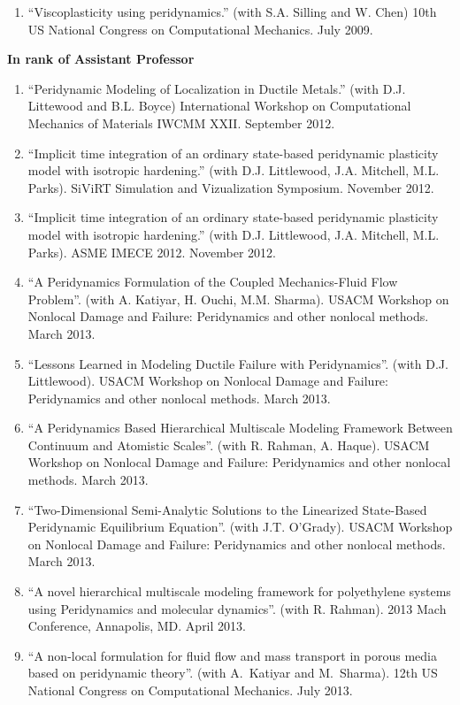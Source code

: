 \ifdefined\iscockrell
\begin{enumerate}
    \item ``Viscoplasticity using peridynamics.''  (with S.A. Silling and W. Chen) 10th US National Congress on Computational Mechanics. July 2009.
\end{enumerate}
    \pagebreak[2]
    \textbf{In rank of Assistant Professor}
\begin{enumerate}[resume]
    \item ``Peridynamic Modeling of Localization in Ductile Metals.'' (with D.J. Littewood and B.L. Boyce)  International Workshop on Computational Mechanics of Materials IWCMM XXII. September 2012.
    \item ``Implicit time integration of an ordinary state-based peridynamic plasticity model with isotropic hardening.'' (with D.J. Littlewood, J.A. Mitchell, M.L. Parks).  SiViRT Simulation and Vizualization Symposium.  November 2012.
    \item ``Implicit time integration of an ordinary state-based peridynamic plasticity model with isotropic hardening.'' (with D.J. Littlewood, J.A. Mitchell, M.L. Parks).  ASME IMECE 2012.  November 2012.
    \item ``A Peridynamics Formulation of the Coupled Mechanics-Fluid Flow Problem''. (with A. Katiyar, H. Ouchi, M.M. Sharma). USACM Workshop on Nonlocal Damage and Failure: Peridynamics and other nonlocal methods. March 2013.
    \item ``Lessons Learned in Modeling Ductile Failure with Peridynamics''. (with D.J. Littlewood). USACM Workshop on Nonlocal Damage and Failure: Peridynamics and other nonlocal methods. March 2013.
    \item ``A Peridynamics Based Hierarchical Multiscale Modeling Framework Between Continuum and Atomistic Scales''. (with R. Rahman, A. Haque). USACM Workshop on Nonlocal Damage and Failure: Peridynamics and other nonlocal methods. March 2013.
    \item ``Two-Dimensional Semi-Analytic Solutions to the Linearized State-Based Peridynamic Equilibrium Equation''. (with J.T. O'Grady). USACM Workshop on Nonlocal Damage and Failure: Peridynamics and other nonlocal methods. March 2013.
    \item ``A novel hierarchical multiscale modeling framework for polyethylene systems using Peridynamics and molecular dynamics''. (with R. Rahman). 2013 Mach Conference, Annapolis, MD. April 2013. 
    \item ``A non-local formulation for fluid flow and mass transport in porous media based on peridynamic theory''. (with A.~Katiyar and M.~Sharma). 12th US National Congress on Computational Mechanics. July 2013.

\end{enumerate}
